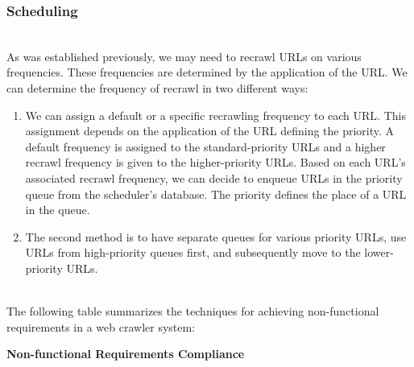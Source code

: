 \subsubsection{Scheduling}\label{_J6o9Z4YAi3EXeMS4trE_}
\\
As was established previously, we may need to recrawl URLs on various frequencies. These frequencies are determined by the application of the URL. We can determine the frequency of recrawl in two different ways:

\begin{enumerate}
\item
\protect{}\label{HBo6qfSVXObYksiwLB1gs}
We can assign a default or a specific recrawling frequency to each URL. This assignment depends on the application of the URL defining the priority. A default frequency is assigned to the standard-priority URLs and a higher recrawl frequency is given to the higher-priority URLs. Based on each URL's associated recrawl frequency, we can decide to enqueue URLs in the priority queue from the scheduler's database. The priority defines the place of a URL in the queue.
\item
\protect{}\label{OT0_mK773UuZJj-ZIa0MD}
The second method is to have separate queues for various priority URLs, use URLs from high-priority queues first, and subsequently move to the lower-priority URLs.
\end{enumerate}
\\
The following table summarizes the techniques for achieving non-functional requirements in a web crawler system:

\textbf{Non-functional Requirements Compliance}

